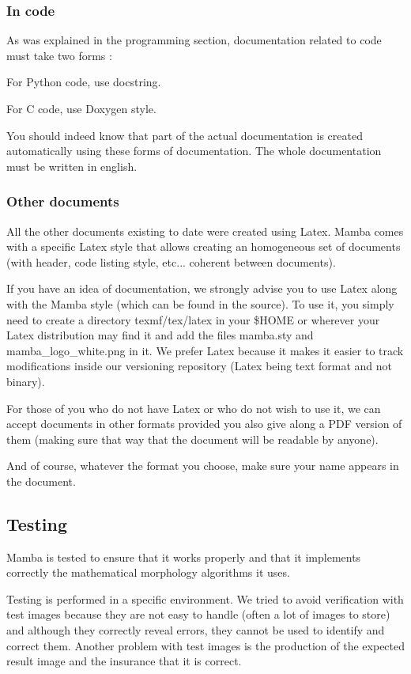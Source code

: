 \documentclass[a4paper,10pt,oneside]{article}
\begin{document}
\subsubsection{In code}

As was explained in the programming section, documentation related
to code must take two forms :

For Python code, use docstring.

For C code, use Doxygen style.

You should indeed know that part of the actual documentation is created
automatically using these forms of documentation. The whole documentation
must be written in english.

\subsubsection{Other documents}

All the other documents existing to date were created using Latex.
Mamba comes with a specific Latex style that allows creating an homogeneous
set of documents (with header, code listing style, etc... coherent
between documents).

If you have an idea of documentation, we strongly advise you to use
Latex along with the Mamba style (which can be found in the source).
To use it, you simply need to create a directory texmf/tex/latex in
your \$HOME or wherever your Latex distribution may find it and add
the files mamba.sty and mamba\_logo\_white.png in it. We prefer Latex
because it makes it easier to track modifications inside our versioning
repository (Latex being text format and not binary).

For those of you who do not have Latex or who do not wish to use it,
we can accept documents in other formats provided you also give along
a PDF version of them (making sure that way that the document will
be readable by anyone).

And of course, whatever the format you choose, make sure your name
appears in the document.

\subsection{Testing}

Mamba is tested to ensure that it works properly and that it
implements correctly the mathematical morphology algorithms it uses.

Testing is performed in a specific environment. We tried to avoid verification
with test images because they are not easy to handle (often a lot of images to
store) and although they correctly reveal errors, they cannot be used to
identify and correct them. Another problem with test images is the production
of the expected result image and the insurance that it is correct.
\end{document}
